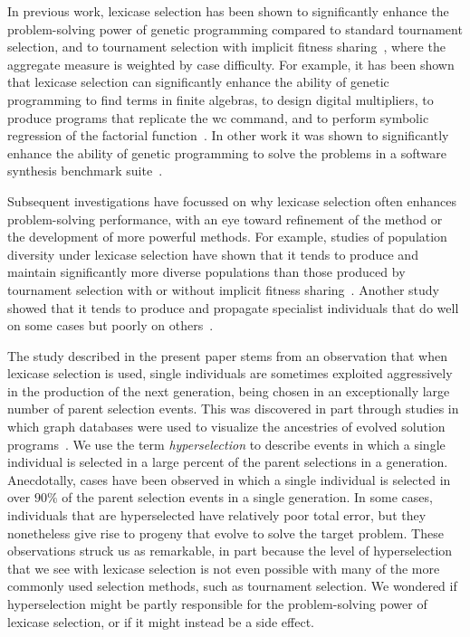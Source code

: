 \documentclass{sig-alternate}
\begin{document}
In previous work, lexicase selection has been shown to significantly enhance the problem-solving power of genetic programming compared to standard tournament selection, and to tournament selection with implicit fitness sharing~\cite{McKay:2000:GECCO}, where the aggregate measure is weighted by case difficulty. For example, it has been shown that lexicase selection can significantly enhance the ability of genetic programming to find terms in finite algebras, to design digital multipliers, to produce programs that replicate the {\ttfamily wc} command, and to perform symbolic regression of the factorial function~\cite{Helmuth:2014:ieeeTEC}.
In other work it was shown to significantly enhance the ability of genetic programming to solve the problems in a software synthesis benchmark suite~\cite{Helmuth:2015:GECCO, Helmuth:2015:dissertation}.

Subsequent investigations have focussed on why lexicase selection often enhances problem-solving performance, with an eye toward refinement of the method or the development of more powerful methods. For example, studies of population diversity under lexicase selection have shown that it tends to produce and maintain significantly more diverse populations than those produced by tournament selection with or without implicit fitness sharing~\cite{Helmuth:2015:GPTP}. Another study showed that it tends to produce and propagate specialist individuals that do well on some cases but poorly on others~\cite{Helmuth:2015:dissertation}.

The study described in the present paper stems from an observation that when lexicase selection is used, single individuals are sometimes exploited aggressively in the production of the next generation, being chosen in an exceptionally large number of parent selection events. This was discovered in part through studies in which graph databases were used to visualize the ancestries of evolved solution programs~\cite{McPhee:2015:GPTP}. We use the term \textit{hyperselection} to describe events in which a single individual is selected in a large percent of the parent selections in a generation. Anecdotally, cases have been observed in which a single individual is selected in over $90\%$ of the parent selection events in a single generation. In some cases, individuals that are hyperselected have relatively poor total error, but they nonetheless give rise to progeny that evolve to solve the target problem. These observations struck us as remarkable, in part because the level of hyperselection that we see with lexicase selection is not even possible with many of the more commonly used selection methods, such as tournament selection. We wondered if hyperselection might be partly responsible for the problem-solving power of lexicase selection, or if it might instead be a side effect.
\end{document}
